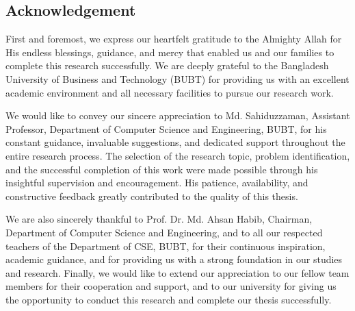 \begin{center}
    \section*{Acknowledgement}
\end{center}
\large First and foremost, we express our heartfelt gratitude to the Almighty Allah for His endless blessings, guidance, and mercy that enabled us and our families to complete this research successfully. We are deeply grateful to the Bangladesh University of Business and Technology (BUBT) for providing us with an excellent academic environment and all necessary facilities to pursue our research work.

We would like to convey our sincere appreciation to Md. Sahiduzzaman, Assistant Professor, Department of Computer Science and Engineering, BUBT, for his constant guidance, invaluable suggestions, and dedicated support throughout the entire research process. The selection of the research topic, problem identification, and the successful completion of this work were made possible through his insightful supervision and encouragement. His patience, availability, and constructive feedback greatly contributed to the quality of this thesis.

We are also sincerely thankful to Prof. Dr. Md. Ahsan Habib, Chairman, Department of Computer Science and Engineering, and to all our respected teachers of the Department of CSE, BUBT, for their continuous inspiration, academic guidance, and for providing us with a strong foundation in our studies and research. Finally, we would like to extend our appreciation to our fellow team members for their cooperation and support, and to our university for giving us the opportunity to conduct this research and complete our thesis successfully.

